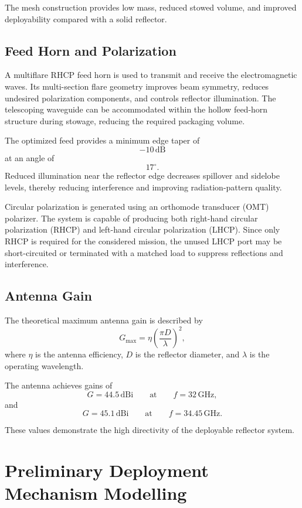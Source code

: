 The mesh construction provides low mass, reduced stowed volume, and improved deployability compared with a solid reflector.

\subsection{Feed Horn and Polarization}

A multiflare RHCP feed horn is used to transmit and receive the electromagnetic waves. Its multi-section flare geometry improves beam symmetry, reduces undesired polarization components, and controls reflector illumination. The telescoping waveguide can be accommodated within the hollow feed-horn structure during stowage, reducing the required packaging volume.

The optimized feed provides a minimum edge taper of
\[
-10\,\mathrm{dB}
\]
at an angle of
\[
17^\circ.
\]
Reduced illumination near the reflector edge decreases spillover and sidelobe levels, thereby reducing interference and improving radiation-pattern quality.

Circular polarization is generated using an orthomode transducer (OMT) polarizer. The system is capable of producing both right-hand circular polarization (RHCP) and left-hand circular polarization (LHCP). Since only RHCP is required for the considered mission, the unused LHCP port may be short-circuited or terminated with a matched load to suppress reflections and interference.

\subsection{Antenna Gain}

The theoretical maximum antenna gain is described by
\[
G_{\max}
=
\eta
\left(
\frac{\pi D}{\lambda}
\right)^2,
\]
where $\eta$ is the antenna efficiency, $D$ is the reflector diameter, and $\lambda$ is the operating wavelength.

The antenna achieves gains of
\[
G=44.5\,\mathrm{dBi}
\qquad \text{at} \qquad
f=32\,\mathrm{GHz},
\]
and
\[
G=45.1\,\mathrm{dBi}
\qquad \text{at} \qquad
f=34.45\,\mathrm{GHz}.
\]

These values demonstrate the high directivity of the deployable reflector system.

\newpage
\section{Preliminary Deployment Mechanism Modelling }

